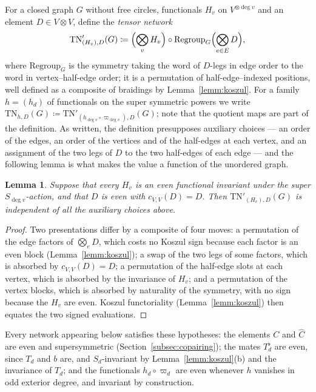 \documentclass[11pt]{article}
\newtheorem{lemm}[theo]{Lemma}
\newcommand{\copair}{C}                           %
\newcommand{\twistedC}{\widehat{C}}               %
\newcommand{\mate}[1]{#1^{\flat}}                 %
\newcommand{\symq}[1]{\varpi_{#1}}                %
\begin{document}
For a closed graph $G$ without free circles, functionals $H_{v}$
on $V^{\otimes\deg v}$ and an element $D\in V\otimes V$, define
the \emph{tensor network}
\[
\mathrm{TN}'_{(H_{v}),D}(G)\coloneqq
\Bigl(\bigotimes_{v}H_{v}\Bigr)\circ
\mathrm{Regroup}_{G}\Bigl(\bigotimes_{e\in E}D\Bigr),
\]
where $\mathrm{Regroup}_{G}$ is the symmetry taking the word of
$D$-legs in edge order to the word in vertex--half-edge order; it
is a permutation of half-edge--indexed positions, well defined as
a composite of braidings by Lemma~\ref{lemm:koszul}. For a family
$h=(h_{d})$ of functionals on the super symmetric powers we write
$\mathrm{TN}_{h,D}(G)\coloneqq
\mathrm{TN}'_{(h_{\deg v}\circ\symq{\deg v}),D}(G)$; note that
the quotient maps are part of the definition. As written, the
definition presupposes auxiliary choices --- an order of the
edges, an order of the vertices and of the half-edges at each
vertex, and an assignment of the two legs of $D$ to the two
half-edges of each edge --- and the following lemma is what makes
the value a function of the unordered graph.

\begin{lemm}\label{lemm:TNinv}
Suppose that every $H_{v}$ is an even functional invariant under
the super $S_{\deg v}$-action, and that $D$ is even with
$c_{V,V}(D)=D$. Then $\mathrm{TN}'_{(H_{v}),D}(G)$ is independent
of all the auxiliary choices above.
\end{lemm}

\begin{proof}
Two presentations differ by a composite of four moves: a
permutation of the edge factors of $\bigotimes_{e}D$, which costs
no Koszul sign because each factor is an even block
(Lemma~\ref{lemm:koszul}); a swap of the two legs of some factors,
which is absorbed by $c_{V,V}(D)=D$; a permutation of the
half-edge slots at each vertex, which is absorbed by the
invariance of $H_{v}$; and a permutation of the vertex blocks,
which is absorbed by naturality of the symmetry, with no sign
because the $H_{v}$ are even. Koszul functoriality
(Lemma~\ref{lemm:koszul}) then equates the two signed
evaluations.
\end{proof}

Every network appearing below satisfies these hypotheses: the
elements $\copair$ and $\twistedC$ are even and supersymmetric
(Section~\ref{subsec:copairing}); the mates $\mate{T_{d}}$ are
even, since $T_{d}$ and $b$ are, and $S_{d}$-invariant by
Lemma~\ref{lemm:koszul}(b) and the invariance of $T_{d}$; and the
functionals $h_{d}\circ\symq{d}$ are even whenever $h$ vanishes in
odd exterior degree, and invariant by construction.
\end{document}
